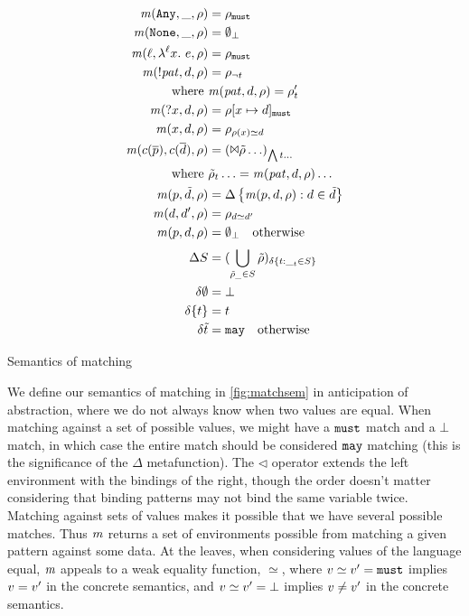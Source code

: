   {\begin{align*}
    \matches(\sany, \_, \menv) &= \menv_\must \\
    \matches(\snone, \_, \menv) &= \emptyset_\bot \\
    \matches(\mtoplevelname, \snlam{\mtoplevelname}{\mvar}{\mexp}, \menv) &= \menv_\must \\
    \matches(\snegpat{\mvpat}, \mdata, \menv) &= \menv_{\neg \mvaluation} \\
    \text{where }& \matches(\mvpat, \mdata, \menv) = \menv'_\mvaluation \\
    \matches(\sbind{\mvar}, \mdata, \menv) &= \menv[\mvar \mapsto \mdata]_\must \\
    \matches(\mvar, \mdata, \menv) &= \menv_{\menv(\mvar) \simeq \mdata} \\
    \matches(\mconstructor(\many{\mpat}), \mconstructor(\many{\mdata}), \menv) &= (\Bowtie \menvs \ldots)_{\bigwedge \mvaluation \ldots} \\
    \text{where }& \menvs_\mvaluation \ldots = \matches(\mvpat, \mdata, \menv) \ldots \\
    \matches(\mpat, \isset{\mdata}, \menv) &= \Delta\setbuild{\matches(\mpat, \mdata, \menv)}{\mdata \in \isset{\mdata}} \\
    \matches(\mdata, \mdata', \menv) &= \menv_{\mdata \simeq \mdata'} \\
    \matches(\mpat, \mdata, \menv) &= \emptyset_\bot \quad
    \text{otherwise}
    \\[2pt]
    \Delta S &= (\bigcup\limits_{\menvs_{\_} \in S}\menvs)_{\delta \setbuild{\mvaluation}{{\_}_\mvaluation \in S}} \\
    \delta \emptyset &= \bot \\
    \delta \setof{\mvaluation} &= \mvaluation \\
    \delta \isset{t} &= \may \quad \text{otherwise}
  \end{align*}}{\caption{Semantics of matching}\label{fig:matchsem}}

We define our semantics of matching in \autoref{fig:matchsem} in anticipation of abstraction, where we do not always know when two values are equal.
%
When matching against a set of possible values, we might have a ${\tt must}$ match and a $\bot$ match, in which case the entire match should be considered ${\tt may}$ matching (this is the significance of the $\Delta$ metafunction).
%
The $\triangleleft$ operator extends the left environment with the bindings of the right, though the order doesn't matter considering that binding patterns may not bind the same variable twice.
%
Matching against sets of values makes it possible that we have several possible matches.
%
Thus $\mathit{m}$ returns a set of environments possible from matching a given pattern against some data.
%
At the leaves, when considering values of the language equal, $\mathit{m}$ appeals to a weak equality function, $\simeq$, where $v \simeq v' = {\tt must}$ implies $v = v'$ in the concrete semantics, and $v \simeq v' = \bot$ implies $v \neq v'$ in the concrete semantics.

